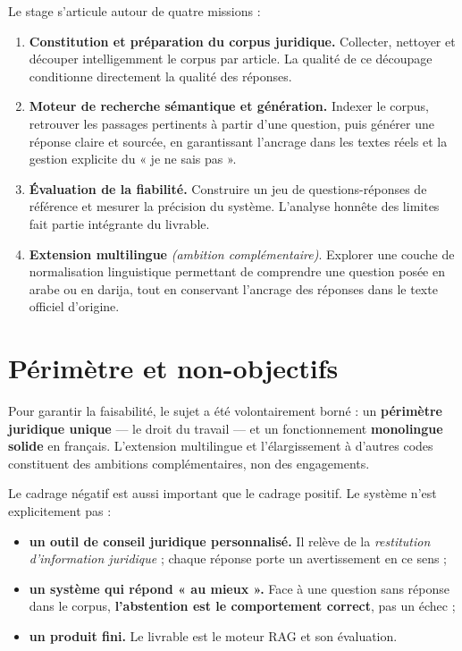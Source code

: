 Le stage s'articule autour de quatre missions :

\begin{enumerate}
    \item \textbf{Constitution et préparation du corpus juridique.} Collecter, nettoyer et
    découper intelligemment le corpus par article. La qualité de ce découpage conditionne
    directement la qualité des réponses.
    \item \textbf{Moteur de recherche sémantique et génération.} Indexer le corpus, retrouver les
    passages pertinents à partir d'une question, puis générer une réponse claire et sourcée, en
    garantissant l'ancrage dans les textes réels et la gestion explicite du « je ne sais pas ».
    \item \textbf{Évaluation de la fiabilité.} Construire un jeu de questions-réponses de
    référence et mesurer la précision du système. L'analyse honnête des limites fait partie
    intégrante du livrable.
    \item \textbf{Extension multilingue} \textit{(ambition complémentaire)}. Explorer une couche
    de normalisation linguistique permettant de comprendre une question posée en arabe ou en
    darija, tout en conservant l'ancrage des réponses dans le texte officiel d'origine.
\end{enumerate}

\section{Périmètre et non-objectifs}

Pour garantir la faisabilité, le sujet a été volontairement borné : un \textbf{périmètre
juridique unique} --- le droit du travail --- et un fonctionnement \textbf{monolingue solide} en
français. L'extension multilingue et l'élargissement à d'autres codes constituent des ambitions
complémentaires, non des engagements.

Le cadrage négatif est aussi important que le cadrage positif. Le système n'est explicitement
pas :

\begin{itemize}
    \item \textbf{un outil de conseil juridique personnalisé.} Il relève de la \emph{restitution
    d'information juridique} ; chaque réponse porte un avertissement en ce sens ;
    \item \textbf{un système qui répond « au mieux ».} Face à une question sans réponse dans le
    corpus, \textbf{l'abstention est le comportement correct}, pas un échec ;
    \item \textbf{un produit fini.} Le livrable est le moteur RAG et son évaluation.
\end{itemize}

